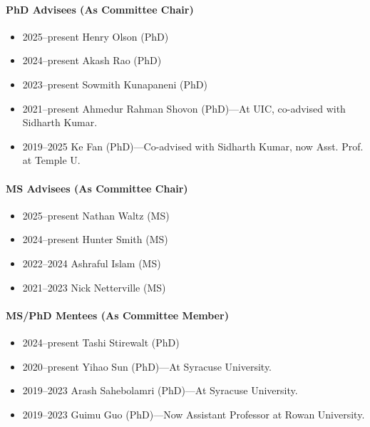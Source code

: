 \paragraph{PhD Advisees (As Committee Chair)}
\begin{itemize}
\vspace{0.15cm}\item 2025--present Henry Olson (PhD)
\item 2024--present Akash Rao (PhD)
\item 2023--present Sowmith Kunapaneni (PhD)
\item 2021--present Ahmedur Rahman Shovon (PhD)---At UIC, co-advised with Sidharth Kumar.
\item 2019--2025 Ke Fan (PhD)---Co-advised with Sidharth Kumar, now Asst. Prof. at Temple U.
\end{itemize}
\paragraph{MS Advisees (As Committee Chair)}
\begin{itemize}
\vspace{0.15cm}\item 2025--present Nathan Waltz (MS)
\item 2024--present Hunter Smith (MS)
\item 2022--2024 Ashraful Islam (MS)
\item 2021--2023 Nick Netterville (MS)
\end{itemize}
\paragraph{MS/PhD Mentees (As Committee Member)}
\begin{itemize}
\vspace{0.15cm}\item 2024--present Tashi Stirewalt (PhD)
\item 2020--present Yihao Sun (PhD)---At Syracuse University.
\item 2019--2023 Arash Sahebolamri (PhD)---At Syracuse University.
\item 2019--2023 Guimu Guo (PhD)---Now Assistant Professor at Rowan University.
\end{itemize}
